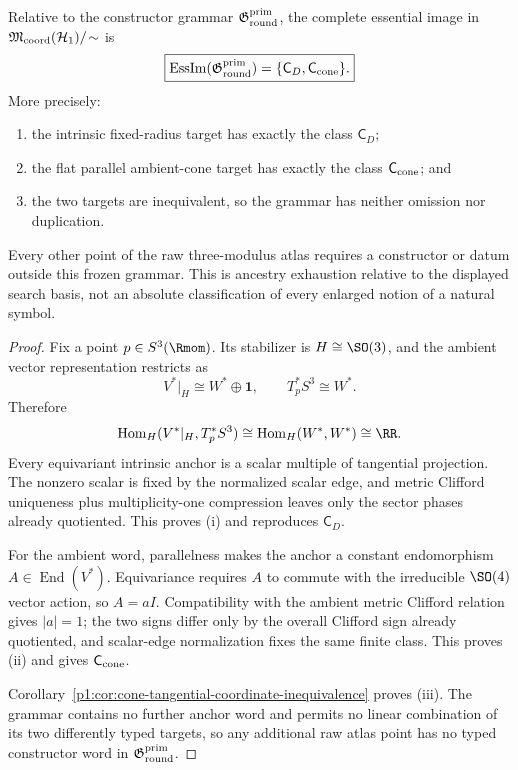 \documentclass[11pt]{article}
\begin{document}
\begin{theorem}
\label{p1:thm:primitive-round-symbol-ancestry-exhaustion}
Relative to the constructor grammar
\(\mathfrak G_{\rm round}^{\rm prim}\), the complete essential image in
\(\mathfrak M_{\rm coord}(\mathcal H_1)/\!\sim\) is
\[
 \boxed{
 \operatorname{EssIm}(\mathfrak G_{\rm round}^{\rm prim})
 =\{\mathsf C_D,\mathsf C_{\rm cone}\}.}
\]
More precisely:
\begin{enumerate}[label=(\roman*)]
\item the intrinsic fixed-radius target has exactly the class
\(\mathsf C_D\);
\item the flat parallel ambient-cone target has exactly the class
\(\mathsf C_{\rm cone}\); and
\item the two targets are inequivalent, so the grammar has neither omission
nor duplication.
\end{enumerate}
Every other point of the raw three-modulus atlas requires a constructor or
datum outside this frozen grammar.  This is ancestry exhaustion relative to
the displayed search basis, not an absolute classification of every enlarged
notion of a natural symbol.
\end{theorem}

\begin{proof}
Fix a point \(p\in S^3(\Rmom)\).  Its stabilizer is
\(H\cong\SO(3)\), and the ambient vector representation restricts as
\[
 V^*|_H\cong W^*\oplus\mathbf1,
 \qquad T_p^*S^3\cong W^*.
\]
Therefore
\[
 \operatorname{Hom}_H(V^*|_H,T_p^*S^3)
 \cong\operatorname{Hom}_H(W^*,W^*)\cong\RR.
\]
Every equivariant intrinsic anchor is a scalar multiple of tangential
projection.  The nonzero scalar is fixed by the normalized scalar edge, and
metric Clifford uniqueness plus multiplicity-one compression leaves only the
sector phases already quotiented.  This proves (i) and reproduces
\(\mathsf C_D\).

For the ambient word, parallelness makes the anchor a constant endomorphism
\(A\in\operatorname{End}(V^*)\).  Equivariance requires \(A\) to commute with
the irreducible \(\SO(4)\) vector action, so \(A=aI\).  Compatibility with the
ambient metric Clifford relation gives \(|a|=1\); the two signs differ only by
the overall Clifford sign already quotiented, and scalar-edge normalization
fixes the same finite class.  This proves (ii) and gives
\(\mathsf C_{\rm cone}\).

Corollary~\ref{p1:cor:cone-tangential-coordinate-inequivalence} proves (iii).
The grammar contains no further anchor word and permits no linear combination
of its two differently typed targets, so any additional raw atlas point has
no typed constructor word in \(\mathfrak G_{\rm round}^{\rm prim}\).
\end{proof}
\end{document}
